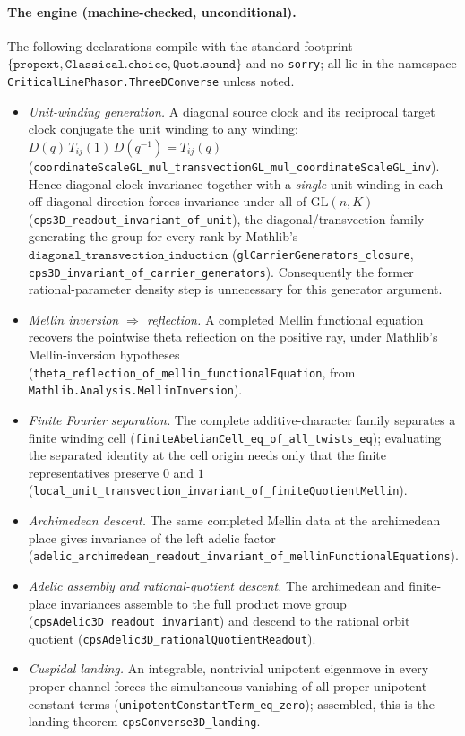 \documentclass[11pt]{article}
\theoremstyle{definition}
\begin{document}
\paragraph{The engine (machine-checked, unconditional).} The following declarations compile with the
standard footprint $\{\texttt{propext},\texttt{Classical.choice},\texttt{Quot.sound}\}$ and no
\texttt{sorry}; all lie in the namespace \texttt{CriticalLinePhasor.ThreeDConverse} unless noted.
\begin{itemize}
\item \emph{Unit-winding generation.} A diagonal source clock and its reciprocal target clock conjugate
the unit winding to any winding: $D(q)\,T_{ij}(1)\,D(q^{-1})=T_{ij}(q)$
(\texttt{coordinateScaleGL\_mul\_transvectionGL\_mul\_coordinateScaleGL\_inv}). Hence diagonal-clock
invariance together with a \emph{single} unit winding in each off-diagonal direction forces invariance
under all of $\mathrm{GL}(n,K)$ (\texttt{cps3D\_readout\_invariant\_of\_unit}), the diagonal/transvection
family generating the group for every rank by Mathlib's
$\texttt{diagonal\_transvection\_induction}$ (\texttt{glCarrierGenerators\_closure},
\texttt{cps3D\_invariant\_of\_carrier\_generators}). Consequently the former rational-parameter density
step is unnecessary for this generator argument.
\item \emph{Mellin inversion $\Rightarrow$ reflection.} A completed Mellin functional equation recovers
the pointwise theta reflection on the positive ray, under Mathlib's Mellin-inversion hypotheses
(\texttt{theta\_reflection\_of\_mellin\_functionalEquation}, from
\texttt{Mathlib.Analysis.MellinInversion}).
\item \emph{Finite Fourier separation.} The complete additive-character family separates a finite winding
cell (\texttt{finiteAbelianCell\_eq\_of\_all\_twists\_eq}); evaluating the separated identity at the cell
origin needs only that the finite representatives preserve $0$ and $1$
(\texttt{local\_unit\_transvection\_invariant\_of\_finiteQuotientMellin}).
\item \emph{Archimedean descent.} The same completed Mellin data at the archimedean place gives invariance
of the left adelic factor (\texttt{adelic\_archimedean\_readout\_invariant\_of\_mellinFunctionalEquations}).
\item \emph{Adelic assembly and rational-quotient descent.} The archimedean and finite-place invariances
assemble to the full product move group (\texttt{cpsAdelic3D\_readout\_invariant}) and descend to the
rational orbit quotient (\texttt{cpsAdelic3D\_rationalQuotientReadout}).
\item \emph{Cuspidal landing.} An integrable, nontrivial unipotent eigenmove in every proper channel
forces the simultaneous vanishing of all proper-unipotent constant terms
(\texttt{unipotentConstantTerm\_eq\_zero}); assembled, this is the landing theorem
\texttt{cpsConverse3D\_landing}.
\end{itemize}
\end{document}
